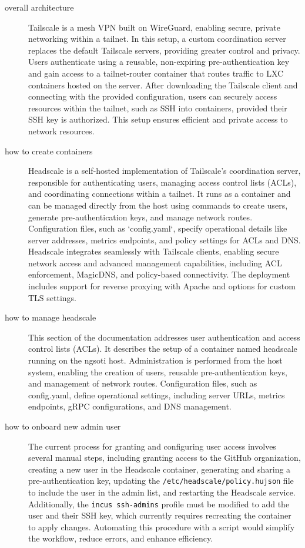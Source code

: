 \begin{description}
	\item [overall architecture] Tailscale is a mesh VPN built on WireGuard,
enabling secure, private networking within a tailnet. In this setup, a custom
coordination server replaces the default
Tailscale servers, providing greater control and privacy. Users authenticate
using a reusable, non-expiring pre-authentication key and gain access to a
tailnet-router container that routes traffic to LXC containers hosted on the
server. After downloading the Tailscale client and connecting with the
provided configuration, users can securely access resources within the
tailnet, such as SSH into containers, provided their SSH key is authorized.
This setup ensures efficient and private access to network resources.
	\item [how to create containers]
Headscale is a self-hosted implementation of Tailscale's coordination server,
responsible for authenticating users, managing access control lists (ACLs),
and coordinating connections within a tailnet. It runs as a container and can
be managed directly from the host using commands to create users, generate
pre-authentication keys, and manage network routes. Configuration files, such
as `config.yaml`, specify operational details like server addresses, metrics
endpoints, and policy settings for ACLs and DNS. Headscale integrates seamlessly
with Tailscale clients, enabling secure network access and advanced management
capabilities, including ACL enforcement, MagicDNS, and policy-based connectivity.
The deployment includes support for reverse proxying with Apache and options
for custom TLS settings.
            \item [how to manage headscale]
This section of the documentation addresses user authentication and access
control lists (ACLs). It describes the setup of a container named headscale
running on the ngsoti host. Administration is performed from the host system,
enabling the creation of users, reusable pre-authentication keys, and
management of network routes. Configuration files, such as config.yaml,
define operational settings, including server URLs, metrics endpoints,
gRPC configurations, and DNS management.

	\item [how to onboard new admin user]
The current process for granting and configuring user access involves several
manual steps, including granting access to the GitHub organization, creating a
new user in the Headscale container, generating and sharing a pre-authentication
key, updating the \texttt{/etc/headscale/policy.hujson} file to include the user
in the admin list, and restarting the Headscale service. Additionally, the
\texttt{incus ssh-admins} profile must be modified to add the user and their
SSH key, which currently requires recreating the container to apply changes.
Automating this procedure with a script would simplify the workflow, reduce
errors, and enhance efficiency.


\end{description}
